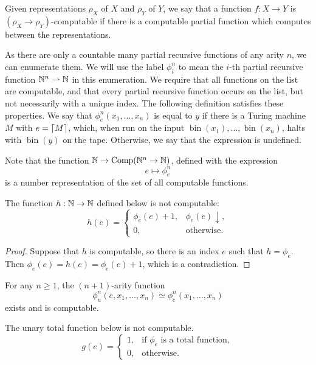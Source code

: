 Given representations $\rho_X$ of $X$ and $\rho_Y$ of $Y$, we say that a
function $f: X \to Y$ is $(\rho_X \to \rho_Y)$-computable if there is a
computable partial function which computes between the representations.

As there are only a countable many partial recursive functions of any arity $n$,
we can enumerate them.
We will use the label $\phi_i^n$ to mean the $i$-th partial recursive function
$\mathbb{N}^n \rightharpoonup \mathbb{N}$ in this enumeration.
We require that all functions on the list are computable, and that every partial
recursive function occurs on the list, but not necessarily with a unique index.
The following definition satisfies these properties.
We say that $\phi_e^n(x_1, \ldots, x_n)$ is equal to $y$ if there is a
Turing machine $M$ with $e = \lceil M \rceil$, which, when run on the input
$\operatorname{bin}(x_1), \ldots, \operatorname{bin}(x_n)$, halts with
$\operatorname{bin}(y)$ on the tape.
Otherwise, we say that the expression is undefined.

Note that the function $\mathbb{N} \to \operatorname{Comp}(\mathbb{N}^n \to \mathbb{N})$, defined with
the expression
\[
  e \mapsto \phi_e^n
\]
is a number representation of the set of all computable functions.

\begin{proposition}
  The function $h: \mathbb{N} \to \mathbb{N}$ defined below is not computable:
  \[
	h(e) =
	\begin{cases}
	  \phi_e(e) + 1, & \phi_e(e) \downarrow, \\
	  0, & \text{otherwise}.
	\end{cases}
  \]
\end{proposition}

\begin{proof}
  Suppose that $h$ is computable, so there is an index $e$ such that $h =
  \phi_e$.
  Then $\phi_e(e) = h(e) = \phi_e(e) + 1$, which is a contradiction.
\end{proof}

\begin{theorem}
  For any $n \ge 1$, the $(n+1)$-arity function
  \[
	\phi_u^n(e, x_1, \ldots, x_n) \simeq \phi_e^n(x_1, \ldots, x_n)
  \]
  exists and is computable.
\end{theorem}

\begin{proposition}
  The unary total function below is not computable.
  \[
	g(e) =
	\begin{cases}
	  1, & \text{if $\phi_e$ is a total function}, \\
	  0, & \text{otherwise}.
	\end{cases}
  \]
\end{proposition}

